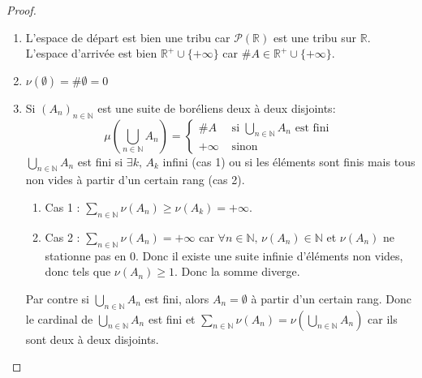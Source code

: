 \begin{proof}
	\begin{enumerate}
		\item L'espace de départ est bien une tribu car $\mathscr{P}(\mathbb{R})$ est une tribu sur $\mathbb{R}$.
		      L'espace d'arrivée est bien $\mathbb{R}^+ \cup \{+\infty\}$ car $\#A \in \mathbb{R}^+ \cup \{+\infty\}$.
		\item $\nu(\emptyset) = \#\emptyset = 0$
		\item Si $(A_n)_{n \in \mathbb{N}}$ est une suite de boréliens deux à deux disjoints:
		      \begin{equation*}
			      \mu(\bigcup\limits_{n \in \mathbb{N}} A_n) = \left\{\begin{array}{ll}
				      \#A     & \text{ si } \bigcup\limits_{n \in \mathbb{N}} A_n \text{ est fini } \\
				      +\infty & \text{ sinon }
			      \end{array}
			      \right.
		      \end{equation*}
		      $\bigcup\limits_{n \in \mathbb{N}} A_n$ est fini si $\exists k ,\, A_k$ infini (cas 1) ou si les éléments sont
		      finis mais tous non vides à partir d'un certain rang (cas 2).
		      \begin{enumerate}
			      \item Cas 1 : $\sum\limits_{n \in \mathbb{N}} \nu(A_n) \geq \nu(A_k) = +\infty$.
			      \item Cas 2 : $\sum\limits_{n \in \mathbb{N}} \nu(A_n) = +\infty$ car
			            $\forall n \in \mathbb{N}, \, \nu(A_n) \in \mathbb{N}$ et $\nu(A_n)$ ne stationne pas en 0. Donc il existe une suite
			            infinie d'éléments non vides, donc tels que $\nu(A_n) \geq 1$. Donc la somme diverge.
		      \end{enumerate}
		      Par contre si $\bigcup\limits_{n \in \mathbb{N}} A_n$ est fini, alors $A_n = \emptyset$ à partir d'un certain rang.
		      Donc le cardinal de $\bigcup\limits_{n \in \mathbb{N}} A_n$ est fini et $\sum\limits_{n \in \mathbb{N}} \nu(A_n) = \nu(\bigcup\limits_{n \in \mathbb{N}} A_n)$ car ils
		      sont deux à deux disjoints.
	\end{enumerate}
\end{proof}

